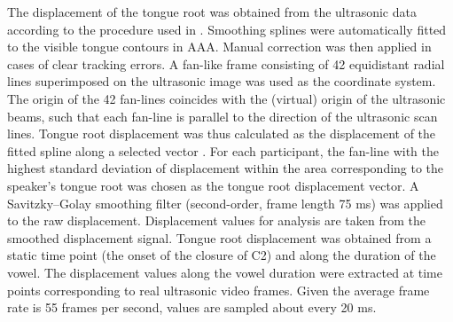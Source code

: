 \documentclass[12pt,]{article}
\begin{document}
The displacement of the tongue root was obtained from the ultrasonic
data according to the procedure used in \citet{kirkham2017}. Smoothing
splines were automatically fitted to the visible tongue contours in AAA.
Manual correction was then applied in cases of clear tracking errors. A
fan-like frame consisting of 42 equidistant radial lines superimposed on
the ultrasonic image was used as the coordinate system. The origin of
the 42 fan-lines coincides with the (virtual) origin of the ultrasonic
beams, such that each fan-line is parallel to the direction of the
ultrasonic scan lines. Tongue root displacement was thus calculated as
the displacement of the fitted spline along a selected vector
\citep{strycharczuk2015}. For each participant, the fan-line with the
highest standard deviation of displacement within the area corresponding
to the speaker's tongue root was chosen as the tongue root displacement
vector. A Savitzky--Golay smoothing filter (second-order, frame length
75 ms) was applied to the raw displacement. Displacement values for
analysis are taken from the smoothed displacement signal. Tongue root
displacement was obtained from a static time point (the onset of the
closure of C2) and along the duration of the vowel. The displacement
values along the vowel duration were extracted at time points
corresponding to real ultrasonic video frames. Given the average frame
rate is 55 frames per second, values are sampled about every 20 ms.
\end{document}
